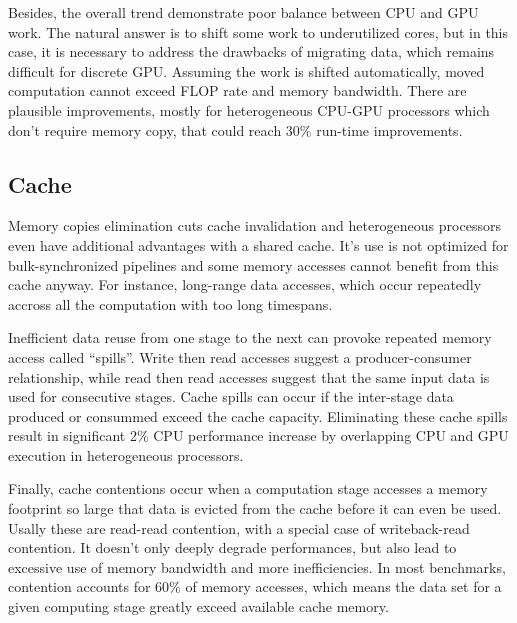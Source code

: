 \documentclass[11pt,twoside,a4paper]{article}
\begin{document}
\begin{multicols}{2}
Besides, the overall trend demonstrate poor balance between CPU and GPU work.
The natural answer is to shift some work to underutilized cores, but in this
case, it is necessary to address the drawbacks of migrating data, which remains
difficult for discrete GPU\@. Assuming the work is shifted automatically, moved
computation cannot exceed FLOP rate and memory bandwidth. There are plausible
improvements, mostly for heterogeneous CPU-GPU processors which don't
require memory copy, that could reach 30\% run-time improvements.

\subsection{Cache}

Memory copies elimination cuts cache invalidation and heterogeneous
processors even have additional advantages with a shared cache. It's use is
not optimized for bulk-synchronized pipelines and some memory accesses cannot
benefit from this cache anyway. For instance, long-range data accesses, which
occur repeatedly accross all the computation with too long timespans.

Inefficient data reuse from one stage to the next can provoke repeated memory
access called ``spills''. Write then read accesses suggest a producer-consumer
relationship, while read then read accesses suggest that the same input data is
used for consecutive stages. Cache spills can occur if the inter-stage data
produced or consummed exceed the cache capacity. Eliminating these cache spills
result in significant 2\% CPU performance increase by overlapping CPU and GPU
execution in heterogeneous processors.

Finally, cache contentions occur when a computation stage accesses a memory
footprint so large that data is evicted from the cache before it can even be
used. Usally these are read-read contention, with a special case of
writeback-read contention. It doesn't only deeply degrade performances, but also
lead to excessive use of memory bandwidth and more inefficiencies. In most
benchmarks, contention accounts for 60\% of memory accesses, which means the data
set for a given computing stage greatly exceed available cache memory.


\end{multicols}
\end{document}
